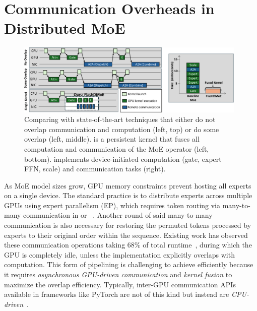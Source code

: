 \section{Communication Overheads in Distributed MoE}\label{sec:communication-overheads-in-distributed-moe}
\begin{figure}[!ht]
    \centering
    \includegraphics[width=0.98\textwidth, keepaspectratio]{figures/intro-fig}
    \caption{Comparing \sysname with state-of-the-art techniques that either do not overlap communication and
    computation (left, top) or do some overlap (left, middle). \sysname is a persistent kernel that fuses all
    computation and communication of the MoE operator (left, bottom). \sysname implements
    device-initiated computation (gate, expert FFN, scale) and communication tasks (right).}
    \label{fig:intro}
\end{figure}
As MoE model sizes grow, GPU memory constraints prevent hosting all experts on a single device.
The standard practice is to distribute experts across multiple GPUs using expert parallelism (EP),
which requires token routing via many-to-many communication in \alltoall or
\allgather~\cite{deepep, arctic, dbrx, 10.1145/3577193.3593704}.
Another round of said many-to-many communication is also necessary for restoring the permuted tokens processed by experts
to their original order within the sequence.
Existing work has observed these communication operations
taking 68\% of total runtime~\cite{10.1145/3603269.3604869, MLSYS2024_339caf45},
during which the GPU is completely idle, unless the implementation explicitly overlaps with computation.
This form of pipelining is challenging to achieve efficiently because it requires
\emph{asynchronous GPU-driven communication} and \emph{kernel fusion} to maximize the overlap efficiency.
Typically, inter-GPU communication APIs available in frameworks like PyTorch are not of this kind but instead are
\emph{CPU-driven}~\cite{nccl}.
